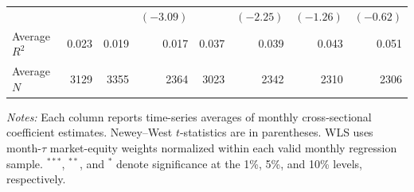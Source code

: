 \begin{table}[H]
{\begin{tabular}{lrrrrrrr}
    &  &  & $(-3.09)$ &  & $(-2.25)$ & $(-1.26)$ & $(-0.62)$ \\
    Average $R^2$ & 0.023 & 0.019 & 0.017 & 0.037 & 0.039 & 0.043 & 0.051 \\
    Average $N$ & 3129 & 3355 & 2364 & 3023 & 2342 & 2310 & 2306 \\
    \bottomrule
  \end{tabular}%
  }
  \begin{minipage}{\textwidth}
  \footnotesize \textit{Notes:} Each column reports time-series averages of monthly cross-sectional coefficient estimates. Newey--West $t$-statistics are in parentheses. WLS uses month-$\tau$ market-equity weights normalized within each valid monthly regression sample. $^{***}$, $^{**}$, and $^{*}$ denote significance at the 1\%, 5\%, and 10\% levels, respectively.
  \end{minipage}
\end{table}

